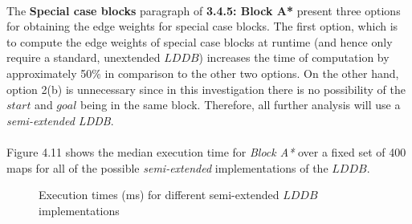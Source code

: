 \documentclass[12pt,notitlepage]{report}
\begin{document}
\\
\noindent
The {\bf Special case blocks} paragraph of {\bfseries 3.4.5: Block A*} present three options for obtaining the edge weights for special case blocks. The first option, which is to compute the edge weights of special case blocks at runtime (and hence only require a standard, unextended $LDDB$) increases the time of computation by approximately 50\% in comparison to the other two options. On the other hand, option 2(b) is unnecessary since in this investigation there is no possibility of the $start$ and $goal$ being in the same block. Therefore, all further analysis will use a {\em semi-extended LDDB}.\\

\\
\noindent
Figure 4.11 shows the median execution time for {\em Block A*} over a fixed set of 400 maps for all of the possible {\em semi-extended} implementations of the $LDDB$.\\

\begin{figure}
\centering
{}
    
\caption{Execution times (ms) for different semi-extended $LDDB$ implementations}
\end{figure}
\end{document}
